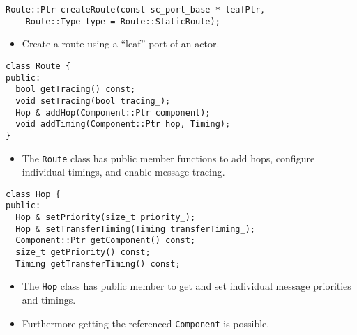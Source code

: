 \begin{frame}[fragile=singleslide]
\begin{lstlisting}
Route::Ptr createRoute(const sc_port_base * leafPtr,
    Route::Type type = Route::StaticRoute);
\end{lstlisting}
\begin{itemize}
\item Create a route using a ``leaf'' port of an actor.
\end{itemize}
\begin{lstlisting}
class Route {
public:
  bool getTracing() const;
  void setTracing(bool tracing_);
  Hop & addHop(Component::Ptr component);
  void addTiming(Component::Ptr hop, Timing);
}
\end{lstlisting}
\begin{itemize}
\item The \lstinline!Route! class has public member functions to add hops, configure individual timings, and enable message tracing.
\end{itemize}
\end{frame}


\begin{frame}[fragile=singleslide]
\begin{lstlisting}
class Hop {
public:
  Hop & setPriority(size_t priority_);
  Hop & setTransferTiming(Timing transferTiming_);
  Component::Ptr getComponent() const;
  size_t getPriority() const;
  Timing getTransferTiming() const;
\end{lstlisting}
\begin{itemize}
\item The \lstinline!Hop! class has public member to get and set individual message priorities and timings.
\item Furthermore getting the referenced \lstinline!Component! is possible.
\end{itemize}
\end{frame}



